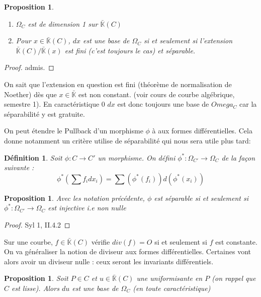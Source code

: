 \documentclass{article}
\newcommand{\K}[0]{\mathbb{K}}
\newcommand{\Kb}[0]{\bar{\K}}
\newtheorem{Prop}[The]{Proposition}
\newtheorem{Def}[The]{Définition}
\begin{document}
\begin{Prop}
	\begin{enumerate}
		\item $\Omega_{C}$ est de dimension 1 sur $\Kb(C)$
		\item Pour $x \in \Kb(C)$, $dx$ est une base de $\Omega_{C}$ si et seulement si l'extension $\Kb(C) / \Kb(x)$ est fini (c'est toujours le cas) et séparable. 
	\end{enumerate}
\end{Prop}

\begin{proof}
	admis.
\end{proof}

On sait que l'extension en question est fini (théorème de normalisation de Noether) dès que $x\in\Kb$ est non constant. (voir cours de courbe algébrique, semestre 1). En caractéristique 0 $dx$ est donc toujours une base de $Omega_{C}$ car la séparabilité y est gratuite. 

On peut étendre le Pullback d'un morphisme $\phi$ à aux formes différentielles. Cela donne notamment un critère utilise de séparabilité qui nous sera utile plus tard:

\begin{Def}
	Soit $\phi : C \rightarrow C'$ un morphisme. On défini $\phi^{*} : \Omega_{C'} \rightarrow \Omega_{C}$ de la façon suivante :
	\begin{equation*}
		\phi^{*}\left(\sum f_idx_i \right) = \sum \left( \phi^{*}(f_i) \right) d\left( \phi^{*}(x_i)\right) 
	\end{equation*}
\end{Def}

\begin{Prop}
	Avec les notation précédente, $\phi$ est séparable si et seulement si $\phi^{*} : \Omega_{C'} \rightarrow \Omega_{C}$ est injective i.e non nulle
\end{Prop}

\begin{proof}
	Syl 1, II.4.2
\end{proof}

Sur une courbe, $f\in\Kb(C)$ vérifie $div(f) = O$ si et seulement si $f$ est constante. On va généraliser la notion de diviseur aux formes différentielles. Certaines vont alors avoir un diviseur nulle : ceux seront les invariants différentiels. 

\begin{Prop}
	Soit $P\in C$ et $u\in \Kb(C)$ une uniformisante en $P$ (on rappel que $C$ est lisse). Alors $du$ est une base de $\Omega_{C}$ (en toute caractéristique) 
\end{Prop}
\end{document}
